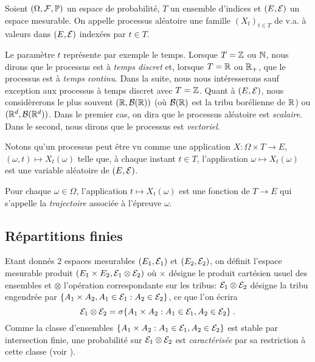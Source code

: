 \begin{definition}
Soient $(\Omega,\mathcal{F},\mathbb{P})$ un espace de probabilit\'e, $T$ un
ensemble d'indices et $(E,\mathcal{E})$ un espace mesurable. On appelle
processus al\'eatoire une famille $(X_t)_{t \in T}$ de v.a. \`a
valeurs dans $(E,\mathcal{E})$ index\'ees par $t \in T$.
\end{definition}
Le param\`etre $t$ repr\'esente par exemple le temps. Lorsque $T=
\mathbb{Z}$ ou $\mathbb{N}$, nous dirons que le processus est \`a \emph{temps discret}
et, lorsque $T=\mathbb{R}$ ou $\mathbb{R}_+$, que le processus est \`a
\emph{temps continu}. Dans la suite, nous nous
int\'eresserons sauf exception aux processus \`a temps
discret avec $T= \mathbb{Z}$. Quant \`a $(E,\mathcal{E})$, nous consid\`ererons
le plus souvent $(\mathbb{R}, \mathcal{B}(\mathbb{R}))$ (o\`u $\mathcal{B}(\mathbb{R})$ est la
tribu bor\'elienne de $\mathbb{R}$) ou $(\mathbb{R}^d, \mathcal{B}(\mathbb{R}^d))$.
Dans le premier cas, on dira que le processus al\'eatoire est
\emph{scalaire}. Dans le second, nous dirons que le processus est
\emph{vectoriel}.

Notons qu'un processus peut \^{e}tre vu comme une application $X: \Omega
\times T \rightarrow E$, $(\omega,t)\mapsto X_t(\omega)$ telle que, \`a
chaque instant $t \in T$, l'application $\omega \mapsto X_t(\omega)$
est une variable al\'eatoire de $(E,\mathcal{E})$.
\begin{definition}
  Pour chaque $\omega\in \Omega$, l'application $t \mapsto
  X_t(\omega)$ est une fonction de $T \rightarrow E$ qui s'appelle la
  \emph{trajectoire} associ\'ee \`a l'\'epreuve $\omega$.
\end{definition}

\subsection{R\'epartitions finies}

Etant donn\'es 2 espaces mesurables $(E_1,\mathcal{E}_1)$ et $(E_2,\mathcal{E}_2)$, on d\'efinit l'espace mesurable produit
$(E_1\times E_2,\mathcal{E}_1\otimes\mathcal{E}_2)$ o\`u $\times$ d\'esigne le produit cart\'esien usuel des ensembles
et $\otimes$ l'op\'eration correspondante sur les tribus: $\mathcal{E}_1\otimes\mathcal{E}_2$ d\'esigne la tribu engendr\'ee par $\{A_1\times A_2,
A_1\in\mathcal{E}_1: A_2\in\mathcal{E}_2\}$, ce que l'on \'ecrira
$$
\mathcal{E}_1\otimes\mathcal{E}_2=\sigma\{A_1\times A_2: A_1\in\mathcal{E}_1, A_2\in\mathcal{E}_2\} \; .
$$
Comme la classe d'ensembles $\{A_1\times A_2: A_1\in\mathcal{E}_1,
A_2\in\mathcal{E}_2\}$ est stable par intersection finie, une probabilit\'e sur
$\mathcal{E}_1\otimes\mathcal{E}_2$  est \emph{caract\'eris\'ee} par sa restriction \`a
cette classe (voir \cite[Corollaire 6.1]{jacod:protter:2003}).

